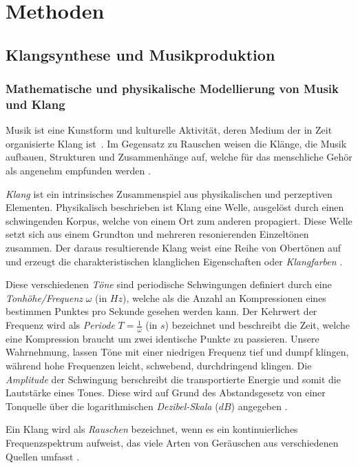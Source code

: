 \documentclass[
  a4paper,  %
  twoside,  %
  bibliography=totoc,
  headsepline,
  cleardoublepage=empty,
  parskip=half,
  draft=false
]{scrbook}
\begin{document}
\chapter{Methoden}

\section{Klangsynthese und Musikproduktion}

\subsection{Mathematische und physikalische Modellierung von Musik und Klang}
\glqq Musik ist eine Kunstform und kulturelle Aktivität, deren Medium der in Zeit organisierte Klang ist\grqq \, \cite{tsuji_physics_2021}. Im Gegensatz zu Rauschen weisen die Klänge, die Musik aufbauen, Strukturen und Zusammenhänge auf, welche für das menschliche Gehör als angenehm empfunden werden \cite{parker_good_2009}.  


\emph{Klang} ist ein intrinsisches Zusammenspiel aus physikalischen und perzeptiven Elementen. Physikalisch beschrieben ist Klang eine Welle, ausgelöst durch einen schwingenden Korpus, welche von einem Ort zum anderen propagiert. Diese Welle setzt sich aus einem Grundton und mehreren resonierenden Einzeltönen zusammen. Der daraus resultierende Klang weist eine Reihe von Obertönen auf und erzeugt die charakteristischen klanglichen Eigenschaften oder \emph{Klangfarben} \cite{tsuji_physics_2021, parker_good_2009}.

Diese verschiedenen \emph{Töne} sind periodische Schwingungen definiert durch eine \emph{Tonhöhe/Frequenz} $\omega$ (in $Hz$), welche als die Anzahl an Kompressionen eines bestimmen Punktes pro Sekunde gesehen werden kann. Der Kehrwert der Frequenz wird als \emph{Periode} $T=\frac{1}{\omega}$ (in $s$) bezeichnet und beschreibt die Zeit, welche eine Kompression braucht um zwei identische Punkte zu passieren. Unsere Wahrnehmung, lassen Töne mit einer niedrigen Frequenz tief und dumpf klingen, während hohe Frequenzen leicht, schwebend, durchdringend klingen. Die \emph{Amplitude} der Schwingung berschreibt die transportierte Energie und somit die Lautstärke eines Tones. Diese wird auf Grund des Abstandsgesetz von einer Tonquelle über die logarithmischen \emph{Dezibel-Skala} ($dB$) angegeben \cite{tsuji_physics_2021, parker_good_2009}.

Ein Klang wird als \emph{Rauschen} bezeichnet, wenn es ein kontinuierliches Frequenzspektrum aufweist, das viele Arten von Geräuschen aus verschiedenen Quellen umfasst \cite{tsuji_physics_2021}.
\end{document}
